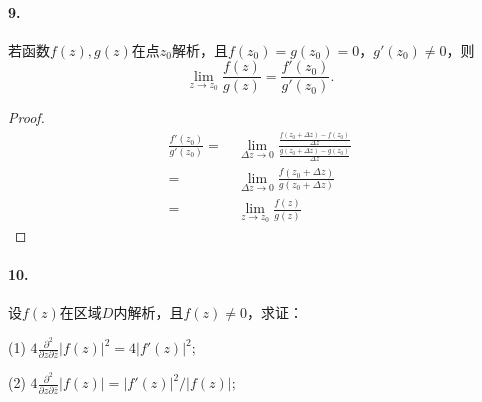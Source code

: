 \documentclass[12pt, a4paper, oneside]{ctexart}
\begin{document}
\paragraph{9.}若函数$f(z),g(z)$在点$z_0$解析，且$f(z_0)=g(z_0)=0$，$g'(z_0)\neq 0$，则
\begin{equation*}
    \lim_{z\rightarrow z_0}\frac{f(z)}{g(z)} = \frac{f'(z_0)}{g'(z_0)}.
\end{equation*}
\begin{proof}
    \begin{equation*}
        \begin{aligned}
            \frac{f'(z_0)}{g'(z_0)} =&\ \lim_{\Delta z\rightarrow 0}\frac{\frac{f(z_0+\Delta z)-f(z_0)}{\Delta z}}{\frac{g(z_0+\Delta z)-g(z_0)}{\Delta z}}\\
            =&\ \lim_{\Delta z\rightarrow 0}\frac{f(z_0+\Delta z)}{g(z_0+\Delta z)}\\
            =&\ \lim_{z\rightarrow z_0}\frac{f(z)}{g(z)}
        \end{aligned}
    \end{equation*}
\end{proof}
\paragraph{10.}设$f(z)$在区域$D$内解析，且$f(z)\neq 0$，求证：

(1) $4\frac{\partial^2}{\partial z\partial\bar{z}}|f(z)|^2=4|f'(z)|^2$;

(2) $4\frac{\partial^2}{\partial z\partial\bar{z}}|f(z)|=|f'(z)|^2/|f(z)|$;
\end{document}
